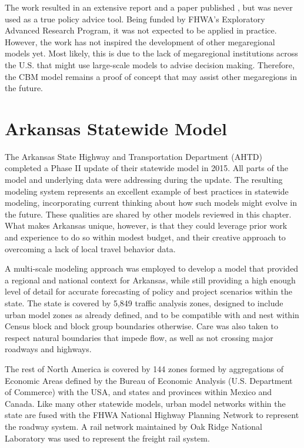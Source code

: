 The work resulted in an extensive report \citep{ducca13} and a paper published \citep{moeckel15b}, but was never used as a true policy advice tool. Being funded by FHWA's Exploratory Advanced Research Program, it was not expected to be applied in practice. However, the work has not inspired the development of other megaregional models yet. Most likely, this is due to the lack of megaregional institutions across the U.S. that might use large-scale models to advise decision making. Therefore, the CBM model remains a proof of concept that may assist other megaregions in the future.

\section{Arkansas Statewide Model}

The Arkansas State Highway and Transportation Department (AHTD) completed a Phase II update of their statewide model in 2015. All parts of the model and underlying data were addressing during the update. The resulting modeling system represents an excellent example of best practices in statewide modeling, incorporating current thinking about how such models might evolve in the future. These qualities are shared by other models reviewed in this chapter. What makes Arkansas unique, however, is that they could leverage prior work and experience to do so within modest budget, and their creative approach to overcoming a lack of local travel behavior data.

A multi-scale modeling approach was employed to develop a model that provided a regional and national context for Arkansas, while still providing a high enough level of detail for accurate forecasting of policy and project scenarios within the state. The state is covered by 5,849 traffic analysis zones, designed to include urban model zones as already defined, and to be compatible with and nest within Census block and block group boundaries otherwise. Care was also taken to respect natural boundaries that impede flow, as well as not crossing major roadways and highways.

The rest of North America is covered by 144 zones formed by aggregations of Economic Areas defined by the Bureau of Economic Analysis (U.S. Department of Commerce) with the USA, and states and provinces within Mexico and Canada. Like many other statewide models, urban model networks within the state are fused with the FHWA National Highway Planning Network to represent the roadway system. A rail network maintained by Oak Ridge National Laboratory was used to represent the freight rail system.


